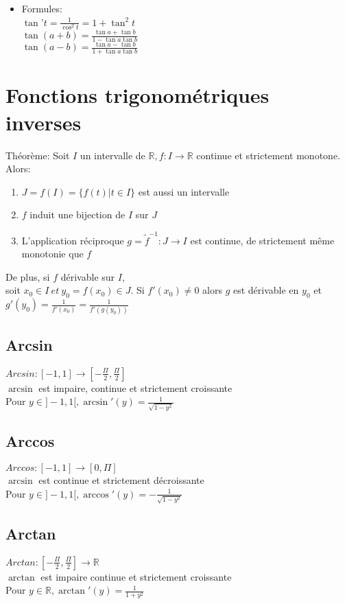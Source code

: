 \documentclass{article}
\begin{document}
\begin{itemize}
\begin{itemize}
		\item Formules: \\
		$\tan$'$ t = \frac{1}{\cos^2 t} = 1 + \tan^2 t$ \\
		$\tan (a+b) = \frac{\tan a + \tan b}{1 - \tan a\tan b}$ \\
		$\tan (a-b) = \frac{\tan a - \tan b}{1 + \tan a\tan b}$ \\
	\end{itemize}

\section{Fonctions trigonom\'{e}triques inverses}
Th\'{e}or\`{e}me: Soit \(I\) un intervalle de \(\mathbb{R}, f: I \rightarrow \mathbb{R}\) continue et strictement monotone. \\
Alors: \begin{enumerate}
	\item \(J = f(I) = \{f(t)|t \in I\}\) est aussi un intervalle \\
	\item \(f\) induit une bijection de \(I\) sur \(J\) \\
	\item L'application r\'{e}ciproque \(g = \tilde{f}^{-1}:J \rightarrow I\) est continue, de strictement m\^{e}me monotonie que \(f\)
\end{enumerate}
De plus, si \(f\) d\'{e}rivable sur \(I\), \\
soit \(x_0 \in I\ et\ y_0 = f(x_0) \in J\). Si \(f'(x_0) \neq 0 \) alors \(g\) est d\'{e}rivable en \(y_0\) et
\(g'(y_0) = \frac{1}{f'(x_0)} = \frac{1}{f'(g(y_0))}\) \\

\subsection{Arcsin}
\(Arcsin: [-1,1] \rightarrow [-\frac{\Pi}{2}, \frac{\Pi}{2}]\) \\
\(\arcsin\) est impaire, continue et strictement croissante \\
Pour \(y \in ]-1,1[, \arcsin'(y) = \frac{1}{\sqrt{1-y^2}}\) \\

\subsection{Arccos}
\(Arccos: [-1,1] \rightarrow [0, \Pi]\) \\
\(\arcsin\) est continue et strictement d\'{e}croissante \\
Pour \(y \in ]-1,1[, \arccos'(y) = -\frac{1}{\sqrt{1-y^2}}\) \\

\subsection{Arctan}
\(Arctan: [-\frac{\Pi}{2},\frac{\Pi}{2}] \rightarrow \mathbb{R}\) \\
\(\arctan\) est impaire continue et strictement croissante \\
Pour \(y \in \mathbb{R}, \arctan'(y) = \frac{1}{1+y^2}\) \\

\end{itemize}
\end{document}

